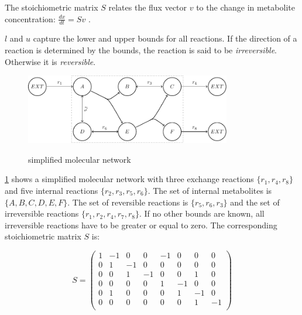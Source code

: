 The stoichiometric matrix $S$ relates the flux vector $v$ to the change in metabolite concentration: $\frac{dx}{dt} = Sv$ \cite{noor_removing_2018}. 

$l$ and $u$ capture the lower and upper bounds for all reactions. If the direction of a reaction is determined by the bounds, the reaction is said to be \textit{irreversible}. Otherwise it is \textit{reversible}.

\begin{figure}[h!]
    \centering
    \caption{simplified molecular network}
    \includegraphics[width=0.8\textwidth]{Images/tikz_graphs_model_with_hyperarcs.pdf}
    \label{fig:simple_model}
\end{figure}


\cref{fig:simple_model} shows a simplified molecular network with three exchange reactions $\{r_1, r_4, r_8\}$ and five internal reactions $\{r_2, r_3, r_5, r_6\}$. The set of internal metabolites is $\{A, B, C, D, E, F\}$. The set of reversible reactions is $\{r_5, r_6, r_3\}$ and the set of irreversible reactions $\{r_1, r_2, r_4, r_7, r_8\}$. If no other bounds are known, all irreversible reactions have to be greater or equal to zero. The corresponding stoichiometric matrix $S$ is:

\begin{equation*}
    S = \begin{pmatrix}
        1 & -1 & 0 & 0 & -1 & 0 & 0 & 0\\
        0 & 1 & -1 & 0 & 0 & 0 & 0 & 0\\
        0 & 0 & 1 & -1 & 0 & 0 & 1 & 0\\
        0 & 0 & 0 & 0 & 1 & -1 & 0 & 0\\
        0 & 1 & 0 & 0 & 0 & 1 & -1 & 0\\
        0 & 0 & 0 & 0 & 0 & 0 & 1 & -1\\
    \end{pmatrix}
\end{equation*}


